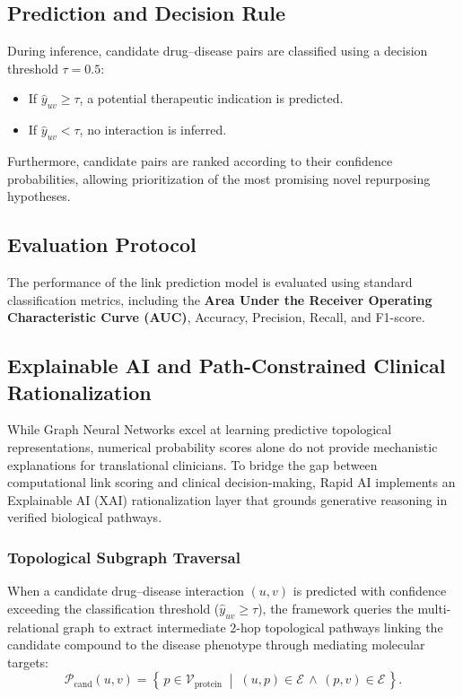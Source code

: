 \documentclass[preprint,12pt]{elsarticle}
\begin{document}
\subsection{Prediction and Decision Rule}
During inference, candidate drug--disease pairs are classified using a decision threshold $\tau = 0.5$:
\begin{itemize}
    \item If $\hat{y}_{uv} \ge \tau$, a potential therapeutic indication is predicted.
    \item If $\hat{y}_{uv} < \tau$, no interaction is inferred.
\end{itemize}
Furthermore, candidate pairs are ranked according to their confidence probabilities, allowing prioritization of the most promising novel repurposing hypotheses.

\subsection{Evaluation Protocol}
The performance of the link prediction model is evaluated using standard classification metrics, including the \textbf{Area Under the Receiver Operating Characteristic Curve (AUC)}, Accuracy, Precision, Recall, and F1-score.

\subsection{Explainable AI and Path-Constrained Clinical Rationalization}
\label{sec:xai}
While Graph Neural Networks excel at learning predictive topological representations, numerical probability scores alone do not provide mechanistic explanations for translational clinicians. To bridge the gap between computational link scoring and clinical decision-making, Rapid AI implements an Explainable AI (XAI) rationalization layer that grounds generative reasoning in verified biological pathways.

\subsubsection{Topological Subgraph Traversal}
When a candidate drug--disease interaction $(u, v)$ is predicted with confidence exceeding the classification threshold ($\hat{y}_{uv} \ge \tau$), the framework queries the multi-relational graph to extract intermediate 2-hop topological pathways linking the candidate compound to the disease phenotype through mediating molecular targets:
\begin{equation}
    \mathcal{P}_{\mathrm{cand}}(u, v) = \left\{\, p \in \mathcal{V}_{\mathrm{protein}} \;\middle|\; (u, p) \in \mathcal{E} \,\land\, (p, v) \in \mathcal{E} \,\right\}.
\end{equation}
\end{document}

